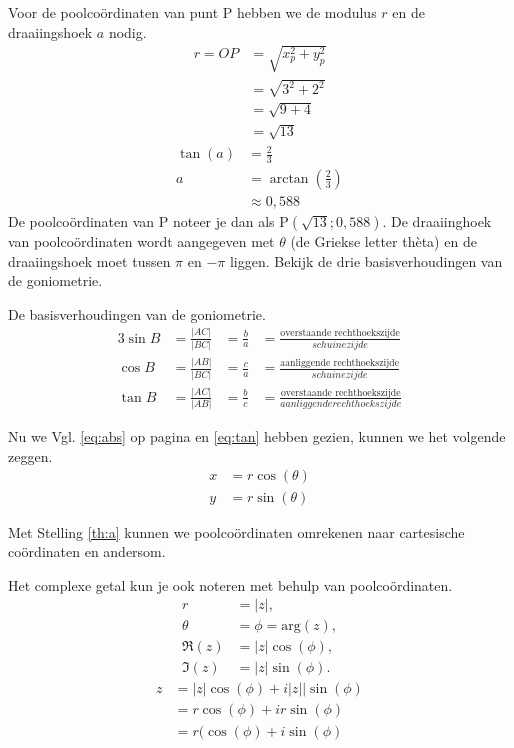 \documentclass[11pt,fleqn]{book} %
\begin{document}
Voor de poolcoördinaten van punt P hebben we de modulus $r$ en de draaiingshoek $a$ nodig.
\begin{align*}
r=OP&=\sqrt{x_p^2+y_p^2}\\
&=\sqrt{3^2+2^2}\\
&=\sqrt{9+4}\\
&=\sqrt{13}
\end{align*}
\begin{align*}
\tan{(a)}&=\frac{2}{3}\\
a&=\arctan{\left(\frac{2}{3}\right)}\\
&\approx 0,588
\end{align*}
De poolcoördinaten van P noteer je dan als P$(\sqrt{13};0,588)$. De draaiinghoek van poolcoördinaten wordt aangegeven met $\theta$ (de Griekse letter thèta) en de draaiingshoek moet tussen $\pi$ en $-\pi$ liggen. Bekijk de drie basisverhoudingen van de goniometrie.
\begin{definition}
De basisverhoudingen van de goniometrie.
\begin{alignat}{3}
\sin{B} &=\frac{\left|AC\right|}{\left|BC\right|} &=\frac{b}{a} &=\frac{\text{overstaande rechthoekszijde}}{schuinezijde}\\
\cos{B} &=\frac{\left|AB\right|}{\left|BC\right|} &=\frac{c}{a} &=\frac{\text{aanliggende rechthoekszijde}}{schuinezijde}\\
\tan{B} &=\frac{\left|AC\right|}{\left|AB\right|} &=\frac{b}{c} &=\frac{\text{overstaande rechthoekszijde}}{aanliggende rechthoekszijde} \label{eq:tan}
\end{alignat}
\end{definition}
\begin{theorem}\label{th:a}
Nu we Vgl. \ref{eq:abs} op pagina \pageref{eq:abs} en \ref{eq:tan} hebben gezien, kunnen we het volgende zeggen.
\begin{align}
x &= r\cos{(\theta)}\\
y &= r\sin{(\theta)}
\end{align}
\end{theorem}
Met Stelling \ref{th:a} kunnen we poolcoördinaten omrekenen naar cartesische coördinaten en andersom.

Het complexe getal kun je ook noteren met behulp van poolcoördinaten.
\begin{align*}
r &=\left|z\right|,\\
\theta &=\phi=\text{arg}(z),\\
\Re(z) &=\left|z\right|\cos{(\phi)},\\
\Im(z) &=\left|z\right|\sin{(\phi)}.
\end{align*}
\begin{align*}
z &=\left|z\right|\cos{(\phi)}+i\left|z|\right|\sin{(\phi)}\\
&= r\cos{(\phi)}+ir\sin{(\phi)}\\
&= r(\cos{(\phi)}+i\sin{(\phi)}
\end{align*}
\end{document}

